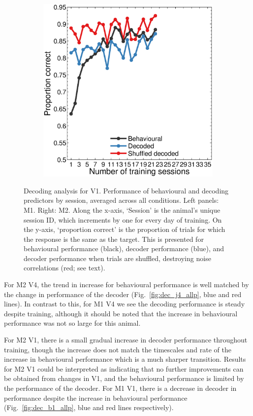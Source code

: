 \begin{figure}[htbp]
\begin{subfigure}[b]{0.5\linewidth}
	\includegraphics[width=\linewidth]{figs/decoding/perf_v1_jack.eps}
    \end{subfigure}
    \caption{%
    Decoding analysis for \ac{V1}.
    Performance of behavioural and decoding predictors by session, averaged across all conditions.
    Left panels: \ac{M1}. Right: \ac{M2}.
	Along the x-axis, `Session' is the animal's unique session ID, which increments by one for every day of training.
    On the y-axis, `proportion correct' is the proportion of trials for which the response is the same as the target.
    This is presented for behavioural performance (black), decoder performance (blue), and decoder performance when trials are shuffled, destroying noise correlations (red; see text).
}
    \label{fig:dec_all_v1}
\end{figure}



For \ac{M2} \ac{V4}, the trend in increase for behavioural performance is well matched by the change in performance of the decoder (Fig.~\ref{fig:dec_j4_allp}, blue and red lines).
In contrast to this, for \ac{M1} \ac{V4} we see the decoding performance is steady despite training, although it should be noted that the increase in behavioural performance was not so large for this animal.

For \ac{M2} \ac{V1}, there is a small gradual increase in decoder performance throughout training, though the increase does not match the timescales and rate of the increase in behavioural performance which is a much sharper transition.
Results for \ac{M2} \ac{V1} could be interpreted as indicating that no further improvements can be obtained from changes in \ac{V1}, and the behavioural performance is limited by the performance of the decoder.
For \ac{M1} \ac{V1}, there is a decrease in decoder in performance despite the increase in behavioural performance (Fig.~\ref{fig:dec_b1_allp}, blue and red lines respectively).


